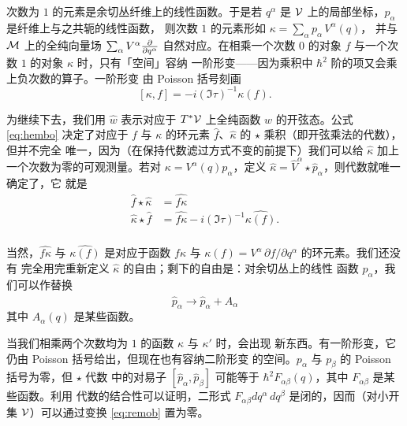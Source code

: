 次数为 $1$ 的元素是余切丛纤维上的线性函数。于是若 $q^\alpha$ 是
${{\cal V}}$ 上的局部坐标，$p_\alpha$ 是纤维上与之共轭的线性函数，
则次数 $1$ 的元素形如 $\kappa=\sum_\alpha p_\alpha\, V^\alpha(q)$，
并与 $\cM$ 上的全纯向量场 $\sum_\alpha
V^\alpha{\partial\over\partial q^\alpha}$ 自然对应。在相乘一个次数
$0$ 的对象 $f$ 与一个次数 $1$ 的对象 $\kappa$ 时，只有「空间」容纳
一阶形变——因为乘积中 $\hbar^2$ 阶的项又会乘上负次数的算子。一阶形变
由 Poisson 括号刻画 %
\setcounter{equation}{11}
\begin{equation}\label{eq:hembo}
[\kappa,
f]=-i(\Im\tau)^{-1}\kappa(f).
\end{equation}

为继续下去，我们用 $\hat w$ 表示对应于 $T^*{{\cal V}}$ 上全纯函数 $w$
的开弦态。公式 \eqref{eq:hembo} 决定了对应于 $f$ 与 $\kappa$ 的环元素
$\hat f$、$\hat\kappa$ 的 $\star$ 乘积（即开弦乘法的代数），但并不完全
唯一，因为（在保持代数滤过方式不变的前提下）我们可以给 $\hat\kappa$
加上一个次数为零的可观测量。若对 $\kappa=V^\alpha(q) p_\alpha$，定义
$\hat\kappa =\hat V^\alpha\star \hat p_\alpha$，则代数就唯一确定了，它
就是 %
\setcounter{equation}{12}
\begin{equation}\label{eq:yembo}
\begin{aligned}\hat f\star\hat\kappa&
=\hat{f\kappa}\\ \hat\kappa\star \hat f&
 =\hat{f\kappa}-i(\Im\tau)^{-1}\hat{\kappa(f)}.\\\end{aligned}
\end{equation}

 当然，$\hat{ f\kappa}$ 与 $\hat{\kappa(f)}$ 是对应于函数 $f\kappa$ 与
$\kappa(f)=V^\alpha\,\partial f/\partial q^\alpha$ 的环元素。我们还没有
完全用完重新定义 $\hat\kappa$ 的自由；剩下的自由是：对余切丛上的线性
函数 $p_\alpha$，我们可以作替换 %
\setcounter{equation}{13}
\begin{equation}\label{eq:remob}
\hat p_\alpha\to \hat p_\alpha+\hat A_\alpha
\end{equation}
 其中 $A_\alpha(q)$ 是某些函数。

当我们相乘两个次数均为 $1$ 的函数 $\kappa$ 与 $\kappa'$ 时，会出现
新东西。有一阶形变，它仍由 Poisson 括号给出，但现在也有容纳二阶形变
的空间。$p_\alpha$ 与 $p_\beta$ 的 Poisson 括号为零，但 $\star$ 代数
中的对易子 $[\hat p_\alpha,\hat p_\beta]$ 可能等于
$\hbar^2 F_{\alpha\beta}(q)$，其中 $F_{\alpha\beta}$ 是某些函数。利用
代数的结合性可以证明，二形式
$F_{\alpha\beta}dq^\alpha\,dq^\beta$ 是闭的，因而（对小开集
${{\cal V}}$）可以通过变换 \eqref{eq:remob} 置为零。


